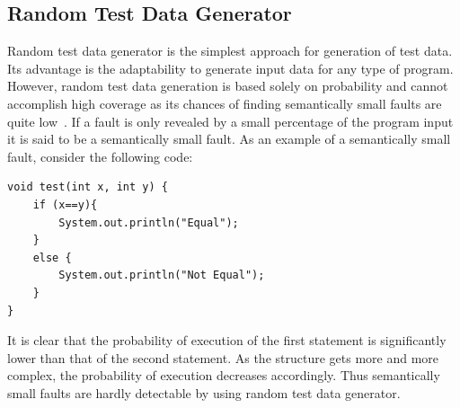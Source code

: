 \subsection{Random Test Data Generator}
\label{sec:randomgenerator_2}
Random test data generator is the simplest approach for generation of test data. Its advantage is the adaptability to generate input data for any type of program. However, random test data generation is based solely on probability and cannot accomplish high coverage as its chances of finding semantically small faults are quite low~\cite{godefroid2005dart}. If a fault is only revealed by a small percentage of the program input it is said to be a semantically small fault. As an example of a semantically small fault, consider the following code:
\bigskip
\bigskip
\begin{lstlisting}
void test(int x, int y) {
    if (x==y){
        System.out.println("Equal");
    }
    else {
        System.out.println("Not Equal");
    }
}
\end{lstlisting}
\bigskip

It is clear that the probability of execution of the first statement is significantly lower than that of the second statement. As the structure gets more and more complex, the probability of execution decreases accordingly. Thus semantically small faults are hardly detectable by using random test data generator. 



